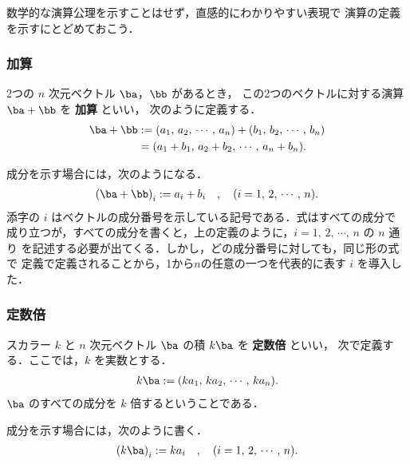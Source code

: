         数学的な演算公理を示すことはせず，直感的にわかりやすい表現で
        演算の定義を示すにとどめておこう．

        \subsubsection{加算}
        2つの $n$ 次元ベクトル $\ba$，$\bb$ があるとき，
        この2つのベクトルに対する演算 $\ba+\bb$ を \textbf{加算} といい，
        次のように定義する．
        \begin{align}
            \ba + \bb   &:= (a_{1},\, a_{2},\,\cdots,\,a_{n}) + (b_{1},\,b_{2},\,\cdots,\, b_{n}) \notag \\
                        &=  (a_{1}+b_{1},\, a_{2}+b_{2},\,\cdots,\, a_{n}+b_{n} ).
        \end{align}

        成分を示す場合には，次のようになる．
        \begin{align}
            {(\ba+\bb)}_{i} := a_{i}+b_{i} \quad,\quad (i=1,\,2,\,\cdots,\,n).
        \end{align}
        添字の $i$ はベクトルの成分番号を示している記号である．式はすべての成分で
        成り立つが，すべての成分を書くと，上の定義のように，$i=1,\,2,\,\cdots,\,n$ の $n$ 通り
        を記述する必要が出てくる．しかし，どの成分番号に対しても，同じ形の式で
        定義で定義されることから，1から$n$の任意の一つを代表的に表す $i$ を導入した．

        \subsubsection{定数倍}
        スカラー $k$ と $n$ 次元ベクトル $\ba$ の積 $k\ba$ を \textbf{定数倍} といい，
        次で定義する．ここでは，$k$ を実数とする．
        \begin{align}
            k\ba := (k{a}_{1},\, k{a}_{2},\, \cdots,\, k{a}_{n}).
        \end{align}
        $\ba$ のすべての成分を $k$ 倍するということである．

        成分を示す場合には，次のように書く．
        \begin{align}
            {(k\ba)}_{i} := k{a}_{i} \quad,\quad  (i=1,\,2,\,\cdots,\,n).
        \end{align}

